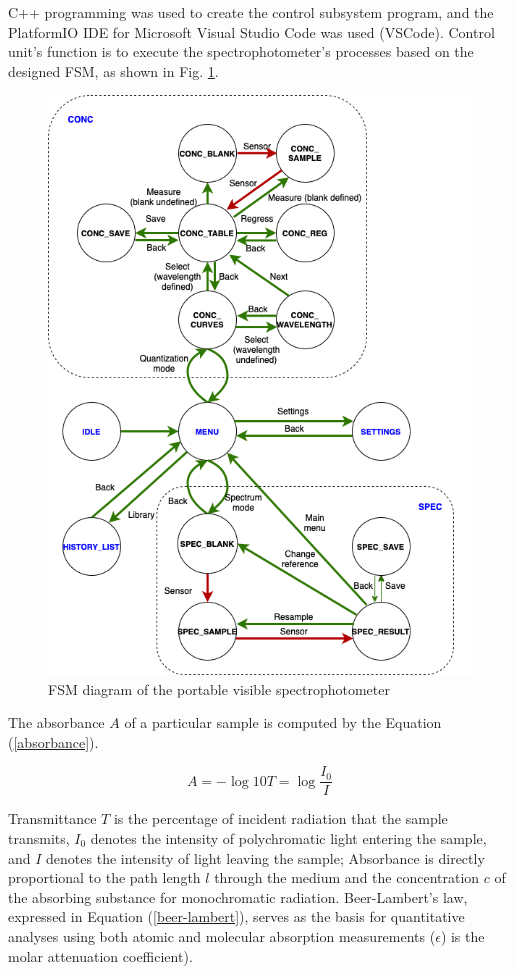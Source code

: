 \documentclass[conference]{IEEEtran}
\begin{document}
C++ programming was used to create the control subsystem program, and the PlatformIO IDE for Microsoft Visual Studio Code was used (VSCode).
Control unit's function is to execute the spectrophotometer's processes based on the designed FSM, as shown in Fig. \ref{fsm}.

    \begin{figure}[htbp]
    \centerline{\includegraphics[scale=0.35]{fsm.png}}
    \caption{FSM diagram of the portable visible spectrophotometer}
    \label{fsm}
    \end{figure}

The absorbance $A$ of a particular sample is computed by the Equation (\ref{absorbance}).

    \begin{equation}
    A=-\log10{T}=\log{\frac{I_{0}}{I}}
    \label{absorbance}
    \end{equation}

Transmittance $T$ is the percentage of incident radiation that the sample transmits, $I_0$ denotes the intensity of polychromatic light entering the sample, and $I$ denotes the intensity of light leaving the sample;
Absorbance is directly proportional to the path length $l$ through the medium and the concentration $c$ of the absorbing substance for monochromatic radiation.
Beer-Lambert's law, expressed in Equation (\ref{beer-lambert}), serves as the basis for quantitative analyses using both atomic and molecular absorption measurements ($\epsilon$) is the molar attenuation coefficient)\cite{b6}.
\end{document}
